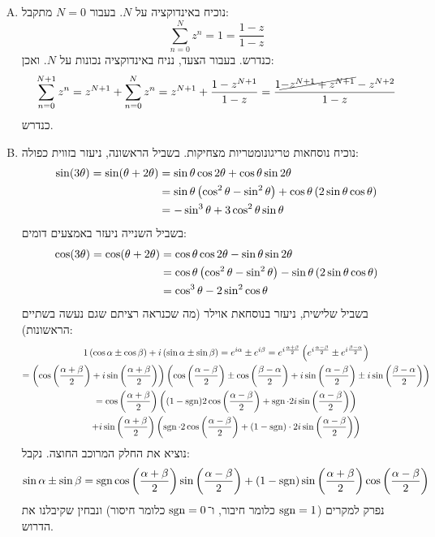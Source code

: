 \documentclass[]{../../../../tex/classes/homework}
\begin{document}
	\section{}
	\begin{enumerate}[(A)]
		\item נוכיח באינדוקציה על $N$. בעבור $N = 0$ מתקבל: 
		\[ \sum_{n = 0}^{N}z^{n} = 1 = \frac{1 - z}{1 - z} \]
		כנדרש. בעבור הצעד, נניח באינדוקציה נכונות על $N$. ואכן: 
		\[ \sum_{n = 0}^{N + 1}z^{n} = z^{N + 1} + \sum_{n = 0}^{N}z^{n} = z^{N + 1} + \frac{1 - z^{N + 1}}{1 - z} = \frac{1 \cancel{- z^{N + 1} + z^{N + 1}} - z^{N + 2}}{1 - z} \]
		כנדרש. 
		\item נוכיח נוסחאות טריגונומטריות מצחיקות. בשביל הראשונה, ניעזר בזווית כפולה: 
		\begin{align*}
			\sin(3\theta) = \sin(\theta + 2\theta) &= \sin \theta \cos2\theta + \cos\theta \sin2\theta \\ 
			&= \sin \theta \left ( \cos^{2}\theta - \sin^{2}\theta \right ) + \cos\theta\left ( 2 \sin\theta \cos \theta \right ) \\
			&= -\sin^{3}\theta + 3\cos^{2}\theta \sin\theta
		\end{align*}
		בשביל השנייה ניעזר באמצעים דומים:
		\begin{align*}
			\cos(3 \theta) = \cos(\theta + 2\theta) &= \cos\theta \cos 2\theta - \sin\theta \sin2\theta \\
			&= \cos\theta\left ( \cos^{2}\theta - \sin^{2}\theta \right ) - \sin\theta\left ( 2 \sin \theta \cos\theta \right ) \\
			&= \cos^{3}\theta - 2 \sin^{2}\cos\theta
		\end{align*}
		בשביל שלישית, ניעזר בנוסחאת אוילר (מה שכנראה רציתם שגם נעשה בשתיים הראשונות): 
		\begin{multline*}
			1\left ( \cos\alpha \pm \cos\beta \right ) + i\left ( \sin \alpha \pm \sin \beta \right ) = e^{i\alpha} \pm e^{i\beta} = e^{i\frac{\alpha + \beta}{2}}\left ( e^{i\frac{\alpha - \beta}{2}} \pm e^{i\frac{\beta - \alpha}{2}} \right )  \\
			= \left ( \cos \left ( \frac{\alpha + \beta}{2} \right ) + i \sin\left ( \frac{\alpha + \beta}{2} \right ) \right )\left ( \cos\left ( \frac{\alpha - \beta}{2} \right ) \pm \cos\left ( \frac{\beta - \alpha}{2} \right ) + i\sin\left ( \frac{\alpha - \beta}{2} \right ) \pm i \sin\left ( \frac{\beta - \alpha}{2} \right ) \right ) \\
			= \cos\left ( \frac{\alpha + \beta}{2} \right )\left ( (1 - \operatorname{sgn})2\cos \left ( \frac{\alpha - \beta}{2} \right ) + \operatorname{sgn} \cdot 2i\sin\left ( \frac{\alpha - \beta}{2} \right ) \right ) \\
			+ i\sin\left ( \frac{\alpha + \beta}{2} \right )\left ( \operatorname{sgn}\cdot 2\cos \left ( \frac{\alpha - \beta}{2} \right ) + (1 - \operatorname{sgn}) \cdot 2i\sin\left ( \frac{\alpha - \beta}{2} \right ) \right )
		\end{multline*}
		נוציא את החלק המרוכב החוצה. נקבל: 
		\[ \sin \alpha \pm \sin \beta = \operatorname{sgn}\cos\left ( \frac{\alpha + \beta}{2} \right )\sin\left ( \frac{\alpha - \beta}{2} \right ) + {(1 - \operatorname{sgn})\sin\left ( \frac{\alpha + \beta}{2} \right )\cos\left ( \frac{\alpha - \beta}{2} \right )} \]
		נפרק למקרים ($\operatorname{sgn} = 1$ כלומר חיבור, ו־$\operatorname{sgn} = 0$ כלומר חיסור) ונבחין שקיבלנו את הדרוש. 
	\end{enumerate}
	
\end{document}

